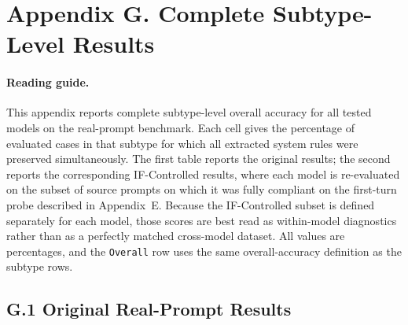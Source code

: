 \documentclass{article}
\begin{document}
\clearpage
\section*{Appendix G. Complete Subtype-Level Results}

\paragraph{Reading guide.}
This appendix reports complete subtype-level overall accuracy for all tested models on the real-prompt benchmark.
Each cell gives the percentage of evaluated cases in that subtype for which all extracted system rules were preserved simultaneously.
The first table reports the original results; the second reports the corresponding IF-Controlled results, where each model is re-evaluated on the subset of source prompts on which it was fully compliant on the first-turn probe described in Appendix~E.
Because the IF-Controlled subset is defined separately for each model, those scores are best read as within-model diagnostics rather than as a perfectly matched cross-model dataset.
All values are percentages, and the \texttt{Overall} row uses the same overall-accuracy definition as the subtype rows.

\subsection*{G.1 Original Real-Prompt Results}
\end{document}
